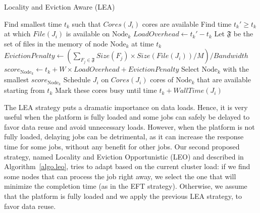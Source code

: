 \documentclass[conference]{IEEEtran}
\newcommand{\Node}[1]{\ensuremath{\mathrm{Node}_{#1}}\xspace}
\newcommand{\file}{\ensuremath{\mathit{File}}\xspace}
\newcommand{\size}{\ensuremath{\mathit{Size}}\xspace}
\newcommand{\memory}{\ensuremath{\mathit{M}}\xspace}
\newcommand{\bandwidth}{\mathit{Bandwidth}\xspace}
\newcommand{\core}{\mathit{Cores}\xspace}
\newcommand{\walltime}{\mathit{WallTime}\xspace}
\newcommand{\filesubset}{\ensuremath{\mathfrak{F}}\xspace}
\newcommand{\nodeset}{\ensuremath{\mathbb{N}}\xspace}
\begin{document}
\begin{algorithm}[t]
\caption{Locality and Eviction Aware (LEA)}\label{algo.lea}
\begin{algorithmic}[1]
		\ForEach{$\Node{k} \in \nodeset$}
			\State Find smallest time $t_k$ such that $\core(J_i)$ cores are available
			\State Find time $t_k'\geq t_k$ at which $\file(J_i)$ is available on $\Node{k}$
			\State $\mathit{LoadOverhead} \gets t_k' - t_k$ %
                        \State Let $\filesubset$ be the set of files in the memory of node \Node{k} at time $t_k$
			\State $\mathit{EvictionPenalty} \gets
			(\sum_{F_j\in\filesubset}\size(F_j) \times \size(\file(J_i))/\memory)/\bandwidth$
			\State $score_{\Node{k}} \gets t_k + W \times \mathit{LoadOverhead} + \mathit{EvictionPenalty}$
		\EndFor
                \State Select \Node{k} with the smallest $score_{\Node{k}}$
                \State Schedule $J_i$ on $\core(J_i)$ cores of \Node{k} that are available starting from $t_k$
                \State Mark these cores busy until time $t_k +\walltime(J_i)$
	\EndFor
\end{algorithmic}
\end{algorithm}

The LEA strategy puts a dramatic importance on data loads. Hence, it
is very useful when the platform is fully loaded and  some jobs
can safely be delayed to favor data reuse and avoid
unnecessary loads. However, when the platform is not fully loaded,
delaying jobs can be detrimental, as it can increase the response
time for some jobs, without any benefit for other jobs. Our second proposed strategy,
named Locality and Eviction Opportunistic (LEO) and described in Algorithm~\ref{algo.leo}, tries to adapt based
on the current cluster load: if we find some nodes that can process the job
right away, we select the one that will minimize the completion time
(as in the EFT strategy). Otherwise, we assume that the platform is
fully loaded and we apply the previous LEA strategy, to favor data reuse.
\end{document}

